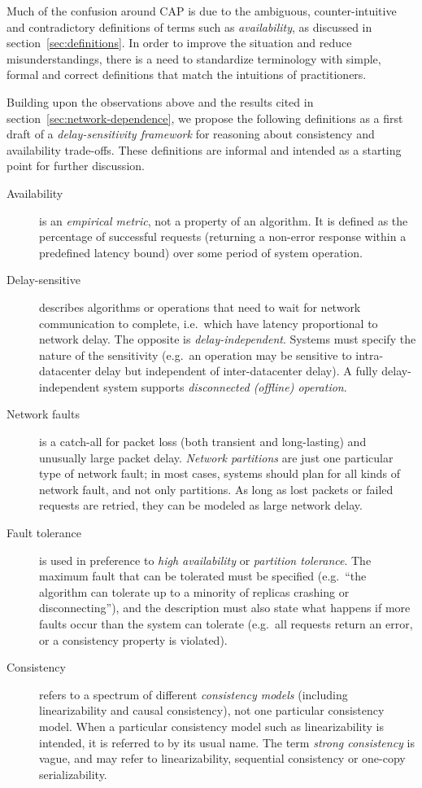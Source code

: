 \documentclass[a4paper,twocolumn,10pt]{article}
\begin{document}
Much of the confusion around CAP is due to the ambiguous, counter-intuitive and contradictory
definitions of terms such as \emph{availability}, as discussed in section~\ref{sec:definitions}. In
order to improve the situation and reduce misunderstandings, there is a need to standardize
terminology with simple, formal and correct definitions that match the intuitions of practitioners.

Building upon the observations above and the results cited in section~\ref{sec:network-dependence},
we propose the following definitions as a first draft of a \emph{delay-sensitivity framework} for
reasoning about consistency and availability trade-offs. These definitions are informal and intended
as a starting point for further discussion.

\begin{description}
\item[Availability] is an \emph{empirical metric}, not a property of an algorithm. It is defined as
    the percentage of successful requests (returning a non-error response within a predefined
    latency bound) over some period of system operation.
\item[Delay-sensitive] describes algorithms or operations that need to wait for network
    communication to complete, i.e.\ which have latency proportional to network delay. The opposite
    is \emph{delay-independent}. Systems must specify the nature of the sensitivity (e.g.\ an
    operation may be sensitive to intra-datacenter delay but independent of inter-datacenter delay).
    A fully delay-independent system supports \emph{disconnected (offline) operation}.
\item[Network faults] is a catch-all for packet loss (both transient and long-lasting) and unusually
    large packet delay. \emph{Network partitions} are just one particular type of network fault; in
    most cases, systems should plan for all kinds of network fault, and not only partitions. As
    long as lost packets or failed requests are retried, they can be modeled as large network delay.
\item[Fault tolerance] is used in preference to \emph{high availability} or \emph{partition
    tolerance}. The maximum fault that can be tolerated must be specified (e.g.\ ``the algorithm can
    tolerate up to a minority of replicas crashing or disconnecting''), and the description must
    also state what happens if more faults occur than the system can tolerate (e.g.\ all requests
    return an error, or a consistency property is violated).
\item[Consistency] refers to a spectrum of different \emph{consistency models} (including
    linearizability and causal consistency), not one particular consistency model. When a particular
    consistency model such as linearizability is intended, it is referred to by its usual name. The
    term \emph{strong consistency} is vague, and may refer to linearizability, sequential
    consistency or one-copy serializability.
\end{description}
\end{document}
